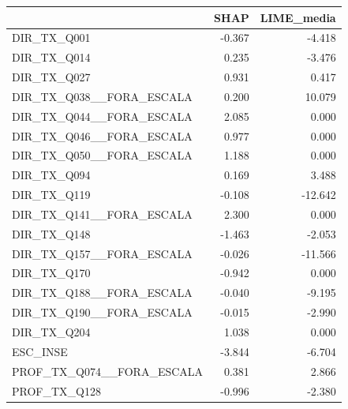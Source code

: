 \begin{tabular}{lrr}
\toprule
 & SHAP & LIME\_media \\
\midrule
DIR\_TX\_Q001 & -0.367 & -4.418 \\
DIR\_TX\_Q014 & 0.235 & -3.476 \\
DIR\_TX\_Q027 & 0.931 & 0.417 \\
DIR\_TX\_Q038\_\_FORA\_ESCALA & 0.200 & 10.079 \\
DIR\_TX\_Q044\_\_FORA\_ESCALA & 2.085 & 0.000 \\
DIR\_TX\_Q046\_\_FORA\_ESCALA & 0.977 & 0.000 \\
DIR\_TX\_Q050\_\_FORA\_ESCALA & 1.188 & 0.000 \\
DIR\_TX\_Q094 & 0.169 & 3.488 \\
DIR\_TX\_Q119 & -0.108 & -12.642 \\
DIR\_TX\_Q141\_\_FORA\_ESCALA & 2.300 & 0.000 \\
DIR\_TX\_Q148 & -1.463 & -2.053 \\
DIR\_TX\_Q157\_\_FORA\_ESCALA & -0.026 & -11.566 \\
DIR\_TX\_Q170 & -0.942 & 0.000 \\
DIR\_TX\_Q188\_\_FORA\_ESCALA & -0.040 & -9.195 \\
DIR\_TX\_Q190\_\_FORA\_ESCALA & -0.015 & -2.990 \\
DIR\_TX\_Q204 & 1.038 & 0.000 \\
ESC\_INSE & -3.844 & -6.704 \\
PROF\_TX\_Q074\_\_FORA\_ESCALA & 0.381 & 2.866 \\
PROF\_TX\_Q128 & -0.996 & -2.380 \\
\bottomrule
\end{tabular}

